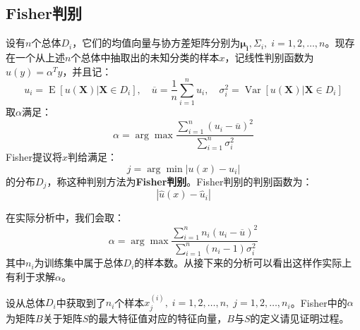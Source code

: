 \subsection{Fisher判别}
\begin{definition}
	设有$n$个总体$D_i$，它们的均值向量与协方差矩阵分别为$\boldsymbol{\mu_i},\Sigma_i,\;i=1,2,\dots,n$。现存在一个从上述$n$个总体中抽取出的未知分类的样本$x$，记线性判别函数为$u(y)=\alpha^Ty$，并且记：
	\begin{equation*}
		u_i=\operatorname{E}[u(\mathbf{X})|\mathbf{X}\in D_i],\quad\overline{u}=\frac{1}{n}\sum_{i=1}^{n}u_i,\quad\sigma_i^2=\operatorname{Var}[u(\mathbf{X})|\mathbf{X}\in D_i]
	\end{equation*}
	取$\alpha$满足：
	\begin{equation*}
		\alpha=\arg\max\frac{\sum\limits_{i=1}^{n}(u_i-\overline{u})^2}{\sum\limits_{i=1}^{n}\sigma_i^2}
	\end{equation*}
	Fisher提议将$x$判给满足：
	\begin{equation*}
		j=\arg\min|u(x)-u_i| 
	\end{equation*}
	的分布$D_j$，称这种判别方法为\textbf{Fisher判别}。Fisher判别的判别函数为：
	\begin{equation*}
		|\hat{u}(x)-\hat{u}_i|
	\end{equation*}
\end{definition}
\begin{note}
	在实际分析中，我们会取：
	\begin{equation*}
		\alpha=\arg\max\frac{\sum\limits_{i=1}^{n}n_i(u_i-\overline{u})^2}{\sum\limits_{i=1}^{n}(n_i-1)\sigma_i^2}
	\end{equation*}
	其中$n_i$为训练集中属于总体$D_i$的样本数。从接下来的分析可以看出这样作实际上有利于求解$\alpha$。
\end{note}
\begin{theorem}
	设从总体$D_i$中获取到了$n_i$个样本$x^{(i)}_j,\;i=1,2,\dots,n,\;j=1,2,\dots,n_i$。Fisher中的$\alpha$为矩阵$B$关于矩阵$S$的最大特征值对应的特征向量，$B$与$S$的定义请见证明过程。
\end{theorem}
